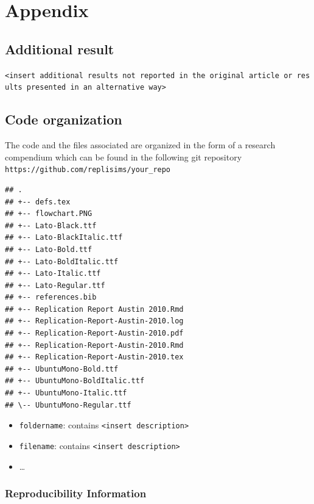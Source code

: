 \documentclass[10,a4paperpaper,]{article}
\begin{document}
\FloatBarrier
\endgroup
\newpage

\section*{Appendix}

\subsection*{Additional result}

\texttt{\textless{}insert\ additional\ results\ not\ reported\ in\ the\ original\ article\ or\ results\ presented\ in\ an\ alternative\ way\textgreater{}}

\subsection{Code organization}

The code and the files associated are organized in the form of a
research compendium which can be found in the following git repository
\texttt{https://github.com/replisims/your\_repo}

\begin{verbatim}
## .
## +-- defs.tex
## +-- flowchart.PNG
## +-- Lato-Black.ttf
## +-- Lato-BlackItalic.ttf
## +-- Lato-Bold.ttf
## +-- Lato-BoldItalic.ttf
## +-- Lato-Italic.ttf
## +-- Lato-Regular.ttf
## +-- references.bib
## +-- Replication Report Austin 2010.Rmd
## +-- Replication-Report-Austin-2010.log
## +-- Replication-Report-Austin-2010.pdf
## +-- Replication-Report-Austin-2010.Rmd
## +-- Replication-Report-Austin-2010.tex
## +-- UbuntuMono-Bold.ttf
## +-- UbuntuMono-BoldItalic.ttf
## +-- UbuntuMono-Italic.ttf
## \-- UbuntuMono-Regular.ttf
\end{verbatim}

\begin{itemize}
\tightlist
\item
  \texttt{foldername}: contains
  \texttt{\textless{}insert\ description\textgreater{}}
\item
  \texttt{filename}: contains
  \texttt{\textless{}insert\ description\textgreater{}}
\item
  \ldots{}
\end{itemize}

\subsubsection*{Reproducibility Information}
\end{document}
